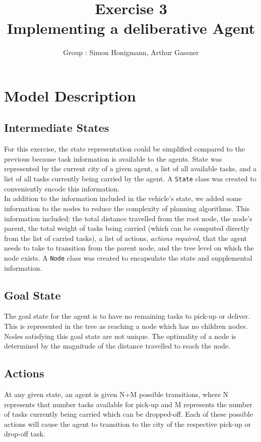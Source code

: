 \documentclass[11pt]{article}
\title{\bf Exercise 3\\ Implementing a deliberative Agent}
\author{Group \textnumero76: Simon Honigmann, Arthur Gassner}
\begin{document}
\maketitle

\section{Model Description}

\subsection{Intermediate States}
For this exercise, the state representation could be simplified compared to the previous because task information is available to the agents. State was represented by the current city of a given agent, a list of all available tasks, and a list of all tasks currently being carried by the agent. A \texttt{State} class was created to conveniently encode this information. \\

In addition to the information included in the vehicle's state, we added some information to the nodes to reduce the complexity of planning algorithms. This information included: the total distance travelled from the root node, the node's parent, the total weight of tasks being carried (which can be computed directly from the list of carried tasks), a list of actions, \textit{actions required}, that the agent needs to take to transition from the parent node, and the tree level on which the node exists. A \texttt{Node} class was created to encapsulate the state and supplemental information. 
\subsection{Goal State}
The goal state for the agent is to have no remaining tasks to pick-up or deliver. This is represented in the tree as reaching a node which has no children nodes. Nodes satisfying this goal state are not unique. The optimality of a node is determined by the magnitude of the distance travelled to reach the node. 

\subsection{Actions}
At any given state, an agent is given N+M possible transitions, where N represents that number tasks available for pick-up and M represents the number of tasks currently being carried which can be dropped-off. Each of these possible actions will cause the agent to transition to the city of the respective pick-up or drop-off task. 
\end{document}
